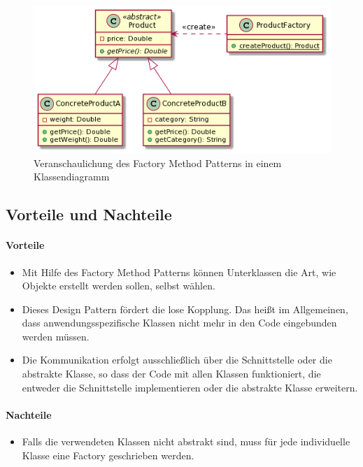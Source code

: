 \begin{figure}[H]
\begin{center}
	\includegraphics[scale=.7]{images/cld_factory_pattern.png}
\end{center}
	\caption{Veranschaulichung des Factory Method Patterns in einem Klassendiagramm}
\end{figure}

\subsection{Vorteile und Nachteile}
\paragraph{Vorteile}

\begin{itemize}
	\item Mit Hilfe des Factory Method Patterns können Unterklassen die Art, wie Objekte erstellt werden sollen, selbst wählen.
	\item Dieses Design Pattern fördert die lose Kopplung. Das heißt im Allgemeinen, dass anwendungsspezifische Klassen nicht mehr in den Code eingebunden werden müssen. 
	\item Die Kommunikation erfolgt ausschließlich über die Schnittstelle oder die abstrakte Klasse, so dass der Code mit allen Klassen funktioniert, die entweder die Schnittstelle implementieren oder die abstrakte Klasse erweitern.
\end{itemize}

\paragraph{Nachteile}

\begin{itemize}
	\item Falls die verwendeten Klassen nicht abstrakt sind, muss für jede individuelle Klasse eine Factory geschrieben werden.
\end{itemize}

